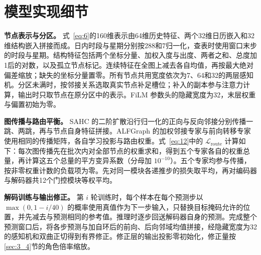 \section{模型实现细节}\label{app:C}
\textbf{节点表示与分区。} 式~\eqref{eq:6}的160维表示由64维历史特征、两个32维日历嵌入和32维结构嵌入拼接而成。日内时段与星期分别按288和7归一化，查表时使用窗口末步的时段与星期。结构特征包括两个坐标分量、加权入度与出度、两者之和、总度加1后的对数，以及孤立节点标记。连续特征在全图上减去各自均值，再按最大绝对偏差缩放；缺失的坐标分量置零。所有节点共用宽度依次为7、64和32的两层感知机。分区未满时，按邻接关系选取真实节点补足槽位；补入的副本参与注意力计算，输出时只取节点在原分区中的表示。FiLM 参数头的隐藏宽度为32，末层权重与偏置初始为零。

\textbf{图传播与路由平衡。} SAHC 的二阶扩散沿行归一化的正向与反向邻接分别传播一跳、两跳，再与节点自身特征拼接。ALFGraph 的加权邻接专家与前向转移专家使用相同的传播矩阵，各自学习投影与路由权重。式~\eqref{eq:12}中的 $\mathcal{L}_{\mathrm{route}}$ 计算如下：每次图传播先在批次内对全部节点的权重求和，得到五个专家各自的权重总量，再计算这五个总量的平方变异系数（分母加 $10^{-10}$）。五个专家均参与传播，按非零权重计数的负载项为零。先对同一模块各递推步的损失取平均，再对编码器与解码器共12个门控模块等权平均。

\textbf{解码训练与输出修正。} 第 $i$ 轮训练时，每个样本在每个预测步以 $\max(0,1-i/40)$ 的概率使用真值作为下一步输入，只替换目标掩码允许的位置，并先减去与预测相同的参考值。推理时逐步回送解码器自身的预测。完成整个预测窗口后，将各步预测与加自环后的前向、后向邻域均值拼接，经隐藏宽度为32的感知机和双曲正切得到有界修正。修正层的输出投影零初始化，修正量按\ref{sec:3_4}节的角色倍率缩放。
